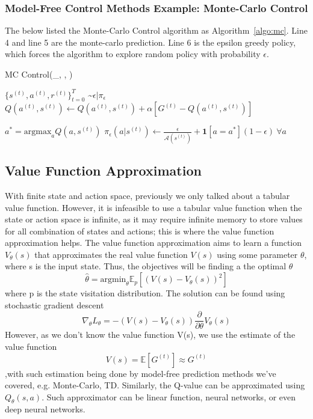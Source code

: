 \documentclass[11pt]{article}
\begin{document}
\subsubsection{Model-Free Control Methods Example: Monte-Carlo Control}
The below listed the Monte-Carlo Control algorithm as Algorithm~\ref{algo:mc}. Line 4 and line 5 are the monte-carlo prediction. Line 6 is the epsilon greedy policy, which forces the algorithm to explore random policy with probability $\epsilon$. 
\begin{algorithm}[H]
\caption{MC Control(\pi_{\epsilon}, \epsilon, \alpha)}
\label{algo:mc}
\begin{algorithmic}[1]
\STATE $\{ s^{(t)}, a^{(t)}, r^{(t)} \}_{t=0}^T$ \sim $\mathcal{\epsilon} | \pi_{\epsilon}$ 
\STATE $Q( a^{(t)}, s^{(t)}) \leftarrow Q( a^{(t)}, s^{(t)}) + \alpha [G^{(t)} - Q( a^{(t)}, s^{(t)})]$ 

\STATE $a^* = \text{argmax}_a Q(a, s^{(t)})$
\STATE $\pi_\epsilon (a|s^{(t)}) \leftarrow \frac{\epsilon}{\mathcal{A}(s^{(t)})} + \textbf{1}[a = a^*](1 - \epsilon) ~ \forall a$
\ENDFOR
\ENDFOR
\end{algorithmic}
\end{algorithm}

\subsection{Value Function Approximation}
With finite state and action space, previously we only talked about a tabular value function. However, it is infeasible to use a tabular value function when the state or action space is infinite, as it may require infinite memory to store values for all combination of states and actions; this is where the value function approximation helps. The value function approximation aims to learn a function $V_\theta (s)$ that approximates the real value function $V(s)$ using some parameter $\theta$, where s is the input state. Thus, the objectives will be finding a the optimal $\theta$
$$\hat{\theta} = \text{argmin}_\theta \mathbb{E}_p [(V(s) - V_\theta (s))^2]$$
where p is the state visitation distribution. The solution can be found using stochastic gradient descent
$$\nabla_\theta L_\theta = -(V(s) - V_\theta (s)) \frac{\partial}{\partial \theta} V_\theta(s)$$
However, as we don't know the value function V(s), we use the estimate of the value function
$$V(s) = \mathbb{E}[G^{(t)}] \approx G^{(t)}$$
,with such estimation being done by model-free prediction methods we've covered, e.g. Monte-Carlo, TD.
Similarly, the Q-value can be approximated using $Q_\theta (s, a)$. Such approximator can be linear function, neural networks, or even deep neural networks. 
\end{document}

